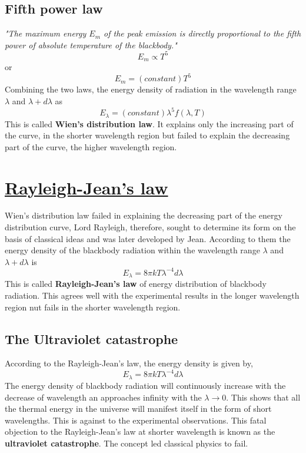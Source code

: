 \documentclass[16pt,a4paper]{article}
\begin{document}
    \subsection{\textbf{Fifth power law}}  \textit{"The maximum energy $E_{m}$ of the peak emission is directly proportional to the fifth power of absolute temperature of the blackbody."}
    \begin{equation*}
        E_{m} \propto T^{5}
    \end{equation*}
    or
    \begin{equation}
        E_{m} = (constant)T^{5}
    \end{equation}
Combining the two laws, the energy density of radiation in the wavelength range $\lambda$ and $\lambda+d\lambda$ as
    \begin{equation}
        E_{\lambda} = (constant)\lambda^{5} f(\lambda,T) 
    \end{equation}
This is called \textbf{Wien's distribution law}. It explains only the increasing part of the curve, in the shorter wavelength region but failed to explain the decreasing part of the curve, the higher wavelength region.

\section{\underline{Rayleigh-Jean's law}} 
Wien's distribution law failed in explaining the decreasing part of the energy distribution curve, Lord Rayleigh, therefore, sought to determine its form on the basis of classical ideas and was later developed by Jean. According to them the energy  density of the blackbody radiation within the wavelength range $\lambda$ and $\lambda+d\lambda$ is 
\begin{equation}
    E_{\lambda} = 8\pi kT\lambda^{-4}d\lambda
\end{equation}
This is called \textbf{Rayleigh-Jean's law} of energy distribution of blackbody radiation. This agrees well with the experimental results in the longer wavelength region nut fails in the shorter wavelength region.
\subsection{The Ultraviolet catastrophe}
According to the Rayleigh-Jean's law, the energy density is given by,
\begin{equation*}
    E_{\lambda} = 8\pi kT\lambda^{-4}d\lambda
\end{equation*}
The energy density of blackbody radiation will continuously increase with the decrease of wavelength an approaches infinity with the $\lambda \rightarrow 0 $. This shows that all the thermal energy in the universe will manifest itself in the form of short wavelengths. This is against to the experimental observations. This fatal objection to the Rayleigh-Jean's law at shorter wavelength is known as the \textbf{ultraviolet catastrophe}. The concept led classical physics to fail.
\newpage
\end{document}
